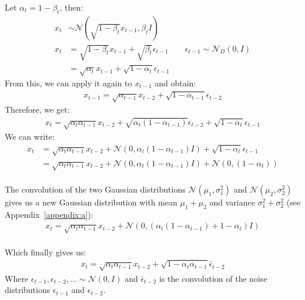 \documentclass[twoside]{article}
\numberwithin{equation}{section}
\numberwithin{figure}{section}
\begin{document}
Let $\alpha_t = 1 - \beta_t$, then:
\begin{align*}
  x_t &\sim \mathcal{N}\left(\sqrt{1 - \beta_t} x_{t-1}, \beta_t I\right) \\
  x_t &= \sqrt{1 - \beta_t} x_{t-1} + \sqrt{\beta_t } \epsilon_{t-1} \qquad \epsilon_{t - 1} \sim \mathcal{N}_D \left(0, I\right) \\
  &= \sqrt{\alpha_t} x_{t-1} + \sqrt{1 - \alpha_t} \epsilon_{t - 1}
\end{align*}
From this, we can apply it again to $x_{t-1}$ and obtain:
\begin{align*}
  x_{t-1} = \sqrt{\alpha_{t-1}} x_{t-2} + \sqrt{1 - \alpha_{t-1}} \epsilon_{t - 2}
\end{align*}
Therefore, we get:
\begin{align*}
  x_t = \sqrt{\alpha_t \alpha_{t-1}} x_{t-2} + \sqrt{\alpha_t\left(1 - \alpha_{t-1}\right)} \epsilon_{t - 2} + \sqrt{1 - \alpha_t} \epsilon_{t - 1}
\end{align*}
We can write:
\begin{align}
  x_t &= \sqrt{\alpha_t \alpha_{t-1}} x_{t-2} + \mathcal{N}\left(0, \alpha_t\left(1 - \alpha_{t-1}\right)I \right) + \sqrt{1 - \alpha_t} \epsilon_{t - 1} \\
&= \sqrt{\alpha_t \alpha_{t-1}} x_{t-2} + \mathcal{N}\left(0, \alpha_t\left(1 - \alpha_{t-1}\right)I\right) + \mathcal{N}\left(0, (1 - \alpha_t) \right) \label{eq:convolution}
\end{align}
\\
The convolution of the two Gaussian distributions $\mathcal{N}(\mu_1, \sigma_1^2)$ and $\mathcal{N}(\mu_2, \sigma_2^2)$ gives us a new Gaussian distribution with mean $\mu_1 + \mu_2$ and variance $\sigma_1^2 + \sigma_2^2$ (see Appendix~\ref{appendix:a}):
\begin{align}
  x_t = \sqrt{\alpha_t \alpha_{t-1}} x_{t-2} + \mathcal{N}\left(0, \left(\alpha_t\left(1 - \alpha_{t-1}\right) + 1 - \alpha_t\right)I\right)
\end{align}
\\
Which finally gives us:
\begin{align*}
  x_t = \sqrt{\alpha_t \alpha_{t-1}} x_{t-2} + \sqrt{1 - \alpha_t \alpha_{t-1}} \bar{\epsilon}_{t - 2}
\end{align*}
Where $\epsilon_{t - 1}, \epsilon_{t - 2}, \ldots \sim \mathcal{N}\left(0, I\right)$ and $\bar{\epsilon}_{t - 2}$ is the convolution of the noise distributions $\epsilon_{t - 1}$ and $\epsilon_{t - 2}$.
\end{document}
